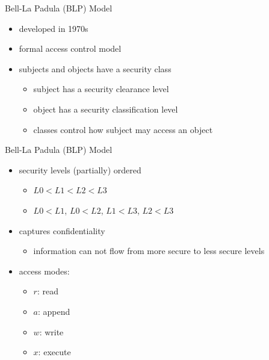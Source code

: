 \documentclass{beamer}
\begin{document}
\begin{frame}{Bell-La Padula (BLP) Model}
  \begin{itemize}
  \item developed in 1970s
  \item formal access control model
  \item subjects and objects have a \alert{security class}
    \begin{itemize}
    \item subject has a \alert{security clearance} level
    \item object has a \alert{security classification} level
    \item classes control how subject may access an object
    \end{itemize}
  \end{itemize}
\end{frame}

\begin{frame}{Bell-La Padula (BLP) Model}
  \begin{itemize}
  \item security levels (partially) ordered
    \begin{itemize}
    \item $L0 < L1 < L2 < L3$
    \item $L0 < L1$, $L0 < L2$, $L1 < L3$, $L2 < L3$
    \end{itemize}
  \item captures \alert{confidentiality}
    \begin{itemize}
      \item information can not flow from more secure to 
        less secure levels
    \end{itemize}
    \item access modes:
    \begin{itemize}
    \item $r$: read
    \item $a$: append
    \item $w$: write
    \item $x$: execute
    \end{itemize}
  \end{itemize}
\end{frame}
\end{document}
